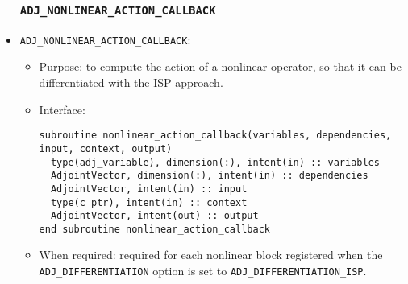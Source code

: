 \documentclass[10pt,authoryear]{elsarticle}
\begin{document}
\begin{itemize}
\subsubsection{\texttt{ADJ\_NONLINEAR\_ACTION\_CALLBACK}}
\item \texttt{ADJ\_NONLINEAR\_ACTION\_CALLBACK}:
 \begin{itemize} 
 \item Purpose: to compute the action of a nonlinear operator, so that it can be differentiated with the ISP approach.
 \item Interface:
\begin{verbatim}
subroutine nonlinear_action_callback(variables, dependencies, input, context, output)
  type(adj_variable), dimension(:), intent(in) :: variables
  AdjointVector, dimension(:), intent(in) :: dependencies
  AdjointVector, intent(in) :: input
  type(c_ptr), intent(in) :: context
  AdjointVector, intent(out) :: output
end subroutine nonlinear_action_callback
\end{verbatim}
 \item When required: required for each nonlinear block registered when the \texttt{ADJ\_DIFFERENTIATION} option is set to \texttt{ADJ\_DIFFERENTIATION\_ISP}.
 \end{itemize}


\end{itemize}
\end{document}
